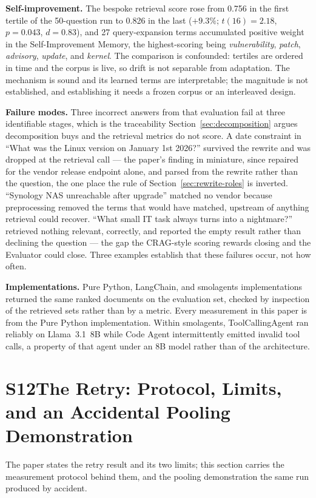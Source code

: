 \documentclass[acmsmall,anonymous,screen]{acmart}
\begin{document}
\textbf{Self-improvement.} The bespoke retrieval score rose from 0.756 in the
first tertile of the 50-question run to 0.826 in the last ($+9.3\%$;
$t(16)=2.18$, $p=0.043$, $d=0.83$), and 27 query-expansion terms accumulated
positive weight in the Self-Improvement Memory, the highest-scoring being
\emph{vulnerability}, \emph{patch}, \emph{advisory}, \emph{update}, and
\emph{kernel}. The comparison is confounded: tertiles are ordered in time and
the corpus is live, so drift is not separable from adaptation. The mechanism is
sound and its learned terms are interpretable; the magnitude is not
established, and establishing it needs a frozen corpus or an interleaved
design.

\textbf{Failure modes.} Three incorrect answers from that evaluation fail at
three identifiable stages, which is the traceability
Section~\ref{sec:decomposition} argues decomposition buys and the retrieval
metrics do not score. A date constraint in ``What was the Linux version on
January 1st 2026?'' survived the rewrite and was dropped at the retrieval call
--- the paper's finding in miniature, since repaired for the vendor release
endpoint alone, and parsed from the rewrite rather than the question, the one
place the rule of Section~\ref{sec:rewrite-roles} is inverted. ``Synology NAS
unreachable after upgrade'' matched no vendor because preprocessing removed the
terms that would have matched, upstream of anything retrieval could recover.
``What small IT task always turns into a nightmare?'' retrieved nothing
relevant, correctly, and reported the empty result rather than declining the
question --- the gap the CRAG-style scoring rewards closing and the Evaluator
could close. Three examples establish that these failures occur, not how often.

\textbf{Implementations.} Pure Python, LangChain, and smolagents
implementations returned the same ranked documents on the evaluation set,
checked by inspection of the retrieved sets rather than by a metric. Every
measurement in this paper is from the Pure Python implementation. Within
smolagents, ToolCallingAgent ran reliably on Llama~3.1~8B while Code Agent
intermittently emitted invalid tool calls, a property of that agent under an
8B model rather than of the architecture.

\section*{S12\quad The Retry: Protocol, Limits, and an Accidental Pooling Demonstration}
The paper states the retry result and its two limits; this section carries the
measurement protocol behind them, and the pooling demonstration the same run
produced by accident.
\end{document}
